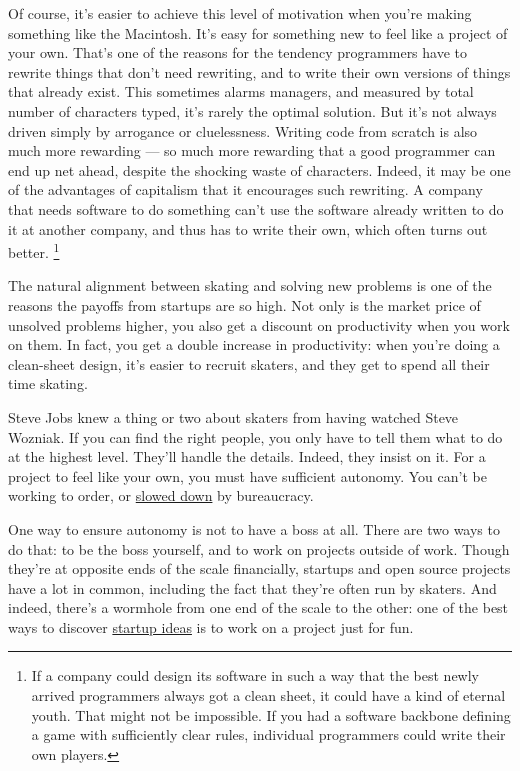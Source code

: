 Of course, it's easier to achieve this level of motivation when you're
making something like the Macintosh. It's easy for something new to feel
like a project of your own. That's one of the reasons for the tendency
programmers have to rewrite things that don't need rewriting, and to
write their own versions of things that already exist. This sometimes
alarms managers, and measured by total number of characters typed, it's
rarely the optimal solution. But it's not always driven simply by
arrogance or cluelessness. Writing code from scratch is also much more
rewarding --- so much more rewarding that a good programmer can end up
net ahead, despite the shocking waste of characters. Indeed, it may be
one of the advantages of capitalism that it encourages such rewriting. A
company that needs software to do something can't use the software
already written to do it at another company, and thus has to write their
own, which often turns out better. \footnote{If a company could design its software in such a way that the
best newly arrived programmers always got a clean sheet, it could have a
kind of eternal youth. That might not be impossible. If you had a
software backbone defining a game with sufficiently clear rules,
individual programmers could write their own players.}

The natural alignment between skating and solving new problems is one of
the reasons the payoffs from startups are so high. Not only is the
market price of unsolved problems higher, you also get a discount on
productivity when you work on them. In fact, you get a double increase
in productivity: when you're doing a clean-sheet design, it's easier to
recruit skaters, and they get to spend all their time skating.

Steve Jobs knew a thing or two about skaters from having watched Steve
Wozniak. If you can find the right people, you only have to tell them
what to do at the highest level. They'll handle the details. Indeed,
they insist on it. For a project to feel like your own, you must have
sufficient autonomy. You can't be working to order, or
\href{artistsship.html}{slowed down} by bureaucracy.

One way to ensure autonomy is not to have a boss at all. There are two
ways to do that: to be the boss yourself, and to work on projects
outside of work. Though they're at opposite ends of the scale
financially, startups and open source projects have a lot in common,
including the fact that they're often run by skaters. And indeed,
there's a wormhole from one end of the scale to the other: one of the
best ways to discover \href{startupideas.html}{startup ideas} is to work
on a project just for fun.

